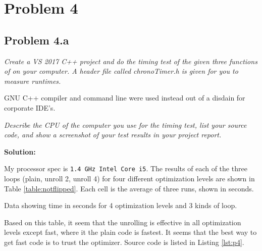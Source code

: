 \documentclass[12pt,letterpaper]{article}
\newcommand{\problem}[1]{\textit{#1} \medskip}
\newcommand{\solution}{ \noindent \textbf{Solution:} \medskip}
\begin{document}
\section*{Problem 4}

\subsection*{Problem 4.a}

\problem{Create a VS 2017 C++ project and do the timing test of the given three functions of
 on your computer. A header file called chronoTimer.h is given for you to measure
 runtimes.}

GNU C++ compiler and command line were used instead out of a disdain for corporate IDE's.

\problem{Describe the CPU of the computer you use for the timing test, list your source code,
 and show a screenshot of your test results in your project report.}

\solution

My processor spec is \lstinline{1.4 GHz Intel Core i5}.  
The results of each of the three loops (plain, unroll 2, unroll 4) for four different optimization
levels are shown in Table \ref{table:notflipped}. Each cell is the average of three runs, shown in
seconds.

\begin{table}[h!]
    \centering
    \caption{Data showing time in seconds for 4 optimization levels and 3 kinds of loop.}
    \label{table:notflipped}
\end{table}

Based on this table, it seem that the unrolling is effective in all optimization levels except
fast, where it the plain code is fastest. It seems that the best way to get fast code is to
trust the optimizer. Source code is listed in Listing \ref{lst:p4}. 

\lstset{language=C}


\end{document}
